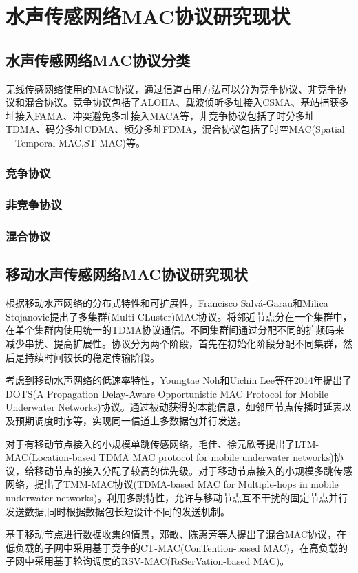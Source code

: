 \chapter{水声传感网络MAC协议研究现状 }
\section{水声传感网络MAC协议分类 }
无线传感网络使用的MAC协议，通过信道占用方法可以分为竞争协议、非竞争协议和混合协议。竞争协议包括了ALOHA、载波侦听多址接入CSMA、基站捕获多址接入FAMA、冲突避免多址接入MACA等，非竞争协议包括了时分多址TDMA、码分多址CDMA、频分多址FDMA，混合协议包括了时空MAC(Spatial—Temporal MAC,ST-MAC)等。
\subsection{竞争协议}

\subsection{非竞争协议}

\subsection{混合协议}

\section{移动水声传感网络MAC协议研究现状}
根据移动水声网络的分布式特性和可扩展性，Francisco Salvá-Garau和Milica Stojanovic提出了多集群(Multi-CLuster)\cite{Multi-Cluster Protocol for Ad Hoc Mobile Underwater Acoustic Networks Oceans2003}MAC协议。将邻近节点分在一个集群中，在单个集群内使用统一的TDMA协议通信。不同集群间通过分配不同的扩频码来减少串扰、提高扩展性。协议分为两个阶段，首先在初始化阶段分配不同集群，然后是持续时间较长的稳定传输阶段。

考虑到移动水声网络的低速率特性，Youngtae Noh和Uichin Lee等在2014年提出了DOTS(A Propagation Delay-Aware Opportunistic MAC Protocol for Mobile Underwater Networks)协议。通过被动获得的本能信息，如邻居节点传播时延表以及预期调度时序等，实现同一信道上多数据包并行发送。\cite{DOTS: A Propagation Delay-Aware Opportunistic MAC Protocol for Mobile Underwater Networks}

对于有移动节点接入的小规模单跳传感网络，毛佳、徐元欣等提出了LTM-MAC(Location-based TDMA MAC protocol for mobile underwater networks)\cite{LTM-MAC: A location-based TDMA MAC protocol for mobile underwater networks}协议，给移动节点的接入分配了较高的优先级。对于移动节点接入的小规模多跳传感网络，提出了TMM-MAC协议(TDMA-based MAC for Multiple-hops in mobile underwater networks)。利用多跳特性，允许与移动节点互不干扰的固定节点并行发送数据,同时根据数据包长短设计不同的发送机制。

基于移动节点进行数据收集的情景，邓敏、陈惠芳等人提出了混合MAC协议\cite{A Hybrid MAC Protocol in Data-collection-oriented
	Underwater Acoustic Sensor Networks}，在低负载的子网中采用基于竞争的CT-MAC(ConTention-based MAC)，在高负载的子网中采用基于轮询调度的RSV-MAC(ReSerVation-based MAC)。



\endinput